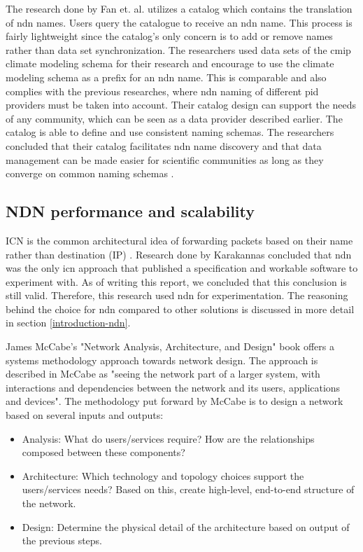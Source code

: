 The research done by Fan et. al. utilizes a catalog which contains the translation of \gls{ndn} names. Users query the catalogue to receive an \gls{ndn} name. This process is fairly lightweight since the catalog's only concern is to add or remove names rather than data set synchronization. The researchers used data sets of the \gls{cmip} climate modeling schema for their research and encourage to use the climate modeling schema as a prefix for an \gls{ndn} name. This is comparable and also complies with the previous researches, where \gls{ndn} naming of different \gls{pid} providers must be taken into account.
Their catalog design can support the needs of any community, which can be seen as a data provider described earlier. The catalog is able to define and use consistent naming schemas.
The researchers concluded that their catalog facilitates \gls{ndn} name discovery and that data management can be made easier for scientific communities as long as they converge on common naming schemas \cite{ndn-man}. 

\subsection{NDN performance and scalability}
\label{introduction-related-work-ndn}
ICN is the common architectural idea of forwarding packets based on their name rather than destination (IP) \cite{jacobson2009networking}. Research done by Karakannas \cite{icn-bd} concluded that \gls{ndn} was the only \gls{icn} approach that published a specification and workable software to experiment with. As of writing this report, we concluded that this conclusion is still valid. Therefore, this research used \gls{ndn} for experimentation. The reasoning behind the choice for \gls{ndn} compared to other solutions is discussed in more detail in section \ref{introduction-ndn}.

James McCabe's "Network Analysis, Architecture, and Design" \cite{mccabe2010network} book offers a systems methodology approach towards network design. The approach is described in McCabe as "seeing the network part of a larger system, with interactions and dependencies between the network and its users, applications and devices". The methodology put forward by McCabe is to design a network based on several inputs and outputs:
\begin{itemize}
    \item Analysis: What do users/services require? How are the relationships composed between these components?
    \item Architecture: Which technology and topology choices support the users/services needs? Based on this, create high-level, end-to-end structure of the network.
    \item Design: Determine the physical detail of the architecture based on output of the previous steps.
\end{itemize}

